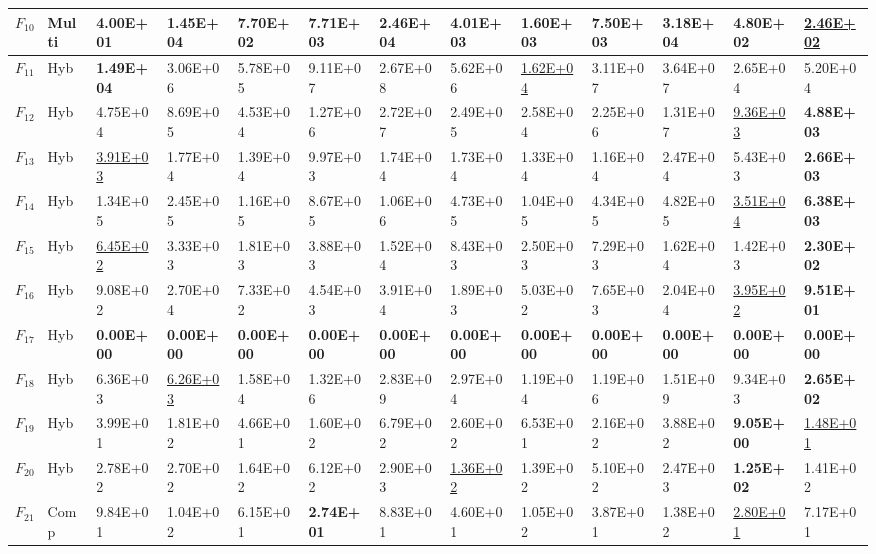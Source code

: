 \begin{table}
\begin{tabular}{cl*{10}{R{1.60cm}}R{1.70cm}}
$F_{10}$ & Multi & \textbf{4.00E+01} & 1.45E+04 & 7.70E+02 & 7.71E+03 & 2.46E+04 & 4.01E+03 & 1.60E+03 & 7.50E+03 & 3.18E+04 & 4.80E+02 & \underline{2.46E+02}\\
\midrule
$F_{11}$ & Hyb & \textbf{1.49E+04} & 3.06E+06 & 5.78E+05 & 9.11E+07 & 2.67E+08 & 5.62E+06 & \underline{1.62E+04} & 3.11E+07 & 3.64E+07 & 2.65E+04 & 5.20E+04\\
$F_{12}$ & Hyb & 4.75E+04 & 8.69E+05 & 4.53E+04 & 1.27E+06 & 2.72E+07 & 2.49E+05 & 2.58E+04 & 2.25E+06 & 1.31E+07 & \underline{9.36E+03} & \textbf{4.88E+03}\\
$F_{13}$ & Hyb & \underline{3.91E+03} & 1.77E+04 & 1.39E+04 & 9.97E+03 & 1.74E+04 & 1.73E+04 & 1.33E+04 & 1.16E+04 & 2.47E+04 & 5.43E+03 & \textbf{2.66E+03}\\
$F_{14}$ & Hyb & 1.34E+05 & 2.45E+05 & 1.16E+05 & 8.67E+05 & 1.06E+06 & 4.73E+05 & 1.04E+05 & 4.34E+05 & 4.82E+05 & \underline{3.51E+04} & \textbf{6.38E+03}\\
$F_{15}$ & Hyb & \underline{6.45E+02} & 3.33E+03 & 1.81E+03 & 3.88E+03 & 1.52E+04 & 8.43E+03 & 2.50E+03 & 7.29E+03 & 1.62E+04 & 1.42E+03 & \textbf{2.30E+02}\\
$F_{16}$ & Hyb & 9.08E+02 & 2.70E+04 & 7.33E+02 & 4.54E+03 & 3.91E+04 & 1.89E+03 & 5.03E+02 & 7.65E+03 & 2.04E+04 & \underline{3.95E+02} & \textbf{9.51E+01}\\
$F_{17}$ & Hyb & \textbf{0.00E+00} & \textbf{0.00E+00} & \textbf{0.00E+00} & \textbf{0.00E+00} & \textbf{0.00E+00} & \textbf{0.00E+00} & \textbf{0.00E+00} & \textbf{0.00E+00} & \textbf{0.00E+00} & \textbf{0.00E+00} & \textbf{0.00E+00}\\
$F_{18}$ & Hyb & 6.36E+03 & \underline{6.26E+03} & 1.58E+04 & 1.32E+06 & 2.83E+09 & 2.97E+04 & 1.19E+04 & 1.19E+06 & 1.51E+09 & 9.34E+03 & \textbf{2.65E+02}\\
$F_{19}$ & Hyb & 3.99E+01 & 1.81E+02 & 4.66E+01 & 1.60E+02 & 6.79E+02 & 2.60E+02 & 6.53E+01 & 2.16E+02 & 3.88E+02 & \textbf{9.05E+00} & \underline{1.48E+01}\\
$F_{20}$ & Hyb & 2.78E+02 & 2.70E+02 & 1.64E+02 & 6.12E+02 & 2.90E+03 & \underline{1.36E+02} & 1.39E+02 & 5.10E+02 & 2.47E+03 & \textbf{1.25E+02} & 1.41E+02\\
\midrule
$F_{21}$ & Comp & 9.84E+01 & 1.04E+02 & 6.15E+01 & \textbf{2.74E+01} & 8.83E+01 & 4.60E+01 & 1.05E+02 & 3.87E+01 & 1.38E+02 & \underline{2.80E+01} & 7.17E+01\\

\end{tabular}
\end{table}
